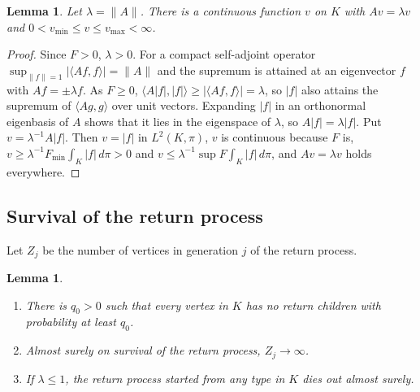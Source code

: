 \documentclass[11pt]{amsart}
\newtheorem{lemma}[theorem]{Lemma}
\theoremstyle{remark}
\numberwithin{equation}{section}
\newcommand{\1}{\mathbf 1}
\begin{document}
\begin{lemma}\label{lem:eigen}
Let $\lambda=\|A\|$. There is a continuous function $v$ on $K$ with $Av=\lambda v$ and $0<v_{\min}\le v\le v_{\max}<\infty$.
\end{lemma}

\begin{proof}
Since $F>0$, $\lambda>0$. For a compact self-adjoint operator $\sup_{\|f\|=1}|\langle Af,f\rangle|=\|A\|$ and the supremum is attained at an eigenvector $f$ with $Af=\pm\lambda f$. As $F\ge0$, $\langle A|f|,|f|\rangle\ge|\langle Af,f\rangle|=\lambda$, so $|f|$ also attains the supremum of $\langle Ag,g\rangle$ over unit vectors. Expanding $|f|$ in an orthonormal eigenbasis of $A$ shows that it lies in the eigenspace of $\lambda$, so $A|f|=\lambda|f|$. Put $v=\lambda^{-1}A|f|$. Then $v=|f|$ in $L^2(K,\pi)$, $v$ is continuous because $F$ is, $v\ge\lambda^{-1}F_{\min}\int_K|f|\,d\pi>0$ and $v\le\lambda^{-1}\sup F\int_K|f|\,d\pi$, and $Av=\lambda v$ holds everywhere.
\end{proof}

\subsection{Survival of the return process}
Let $Z_j$ be the number of vertices in generation $j$ of the return process.

\begin{lemma}\label{lem:return}
\begin{enumerate}[label=\textup{(\alph*)},leftmargin=*]
\item There is $q_0>0$ such that every vertex in $K$ has no return children with probability at least $q_0$.
\item Almost surely on survival of the return process, $Z_j\to\infty$.
\item If $\lambda\le1$, the return process started from any type in $K$ dies out almost surely.
\end{enumerate}
\end{lemma}
\end{document}
